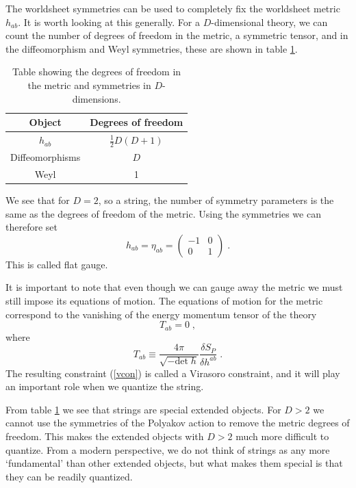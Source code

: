 \documentclass[11pt,a4paper]{article}
\numberwithin{equation}{section}
\numberwithin{table}{section}\setlength{\multlinegap}{25pt}
\newcommand{\be}{\begin{equation}}
\newcommand{\ee}{\end{equation}}
\begin{document}
The worldsheet symmetries can be used to completely fix the worldsheet metric $h_{ab}$. It is worth looking at this generally. For a $D$-dimensional theory, we can count the number of degrees of freedom in the metric, a symmetric tensor, and in the diffeomorphism and Weyl symmetries, these are shown in table \ref{tab:dof}. 
\begin{table}
\centering
\begin{tabular}{|c|c|}
\hline
Object & Degrees of freedom \\
\hline
$h_{ab}$ & $\frac12 D\left(D+1\right)$ \\
\hline
Diffeomorphisms &$D$ \\
\hline
Weyl & 1\\
\hline
\end{tabular}
\caption{Table showing the degrees of freedom in the metric and symmetries in $D$-dimensions.} 
\label{tab:dof}
\end{table}
We see that for $D=2$, so a string, the number of symmetry parameters is the same as the degrees of freedom of the metric. Using the symmetries we can therefore set
\be
h_{ab} = \eta_{ab} = \left( \begin{array}{cc} -1 & 0 \\ 0 & 1 \end{array} \right) \;.
\ee
This is called flat gauge.

It is important to note that even though we can gauge away the metric we must still impose its equations of motion. The equations of motion for the metric correspond to the vanishing of the energy momentum tensor of the theory
\be
T_{ab} = 0 \;,
\label{vcon}
\ee
where
\be
T_{ab} \equiv \frac{4\pi}{\sqrt{-\mathrm{det}\;h}} \frac{\delta S_P}{\delta h^{ab}} \;.
\ee
The resulting constraint (\ref{vcon}) is called a Virasoro constraint, and it will play an important role when we quantize the string.

From table \ref{tab:dof} we see that strings are special extended objects. For $D>2$ we cannot use the symmetries of the Polyakov action to remove the metric degrees of freedom. This makes the extended objects with $D>2$ much more difficult to quantize. From a modern perspective, we do not think of strings as any more `fundamental' than other extended objects, but what makes them special is that they can be readily quantized. 
\end{document}
